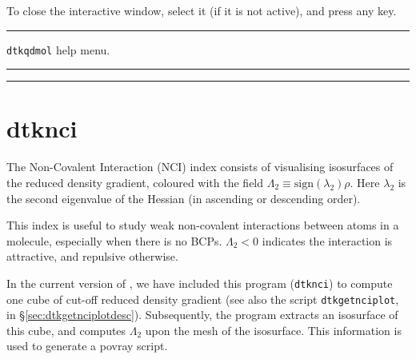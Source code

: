To close the interactive window, select it (if it is not active), and press any key.

\rule{\textwidth}{1pt}
{\center\texttt{dtkqdmol} help menu.\\}
\rule{\textwidth}{1pt}
\begin{footnotesize}
\end{footnotesize}
\rule{\textwidth}{1pt}

\section{\label{sec:dtknci}dtknci}

The Non-Covalent Interaction (NCI) index consists of visualising isosurfaces of the
reduced density gradient, coloured with the field $\Lambda_2\equiv\textrm{sign}(\lambda_2)\rho$.
Here $\lambda_2$ is the second eigenvalue of the Hessian (in ascending or descending order).

This index is useful to study weak non-covalent interactions between atoms in a molecule, especially
when there is no BCPs. $\Lambda_2<0$ indicates the interaction is attractive, and repulsive otherwise.

In the current version of \DTK, we have included this program (\texttt{dtknci}) to compute
one cube of cut-off reduced density gradient (see also the script \texttt{dtkgetnciplot}, in
\S\ref{sec:dtkgetnciplotdesc}). Subsequently, the program extracts an isosurface of this cube,
and computes $\Lambda_2$ upon the mesh of the isosurface. This information is used to
generate a povray script.

